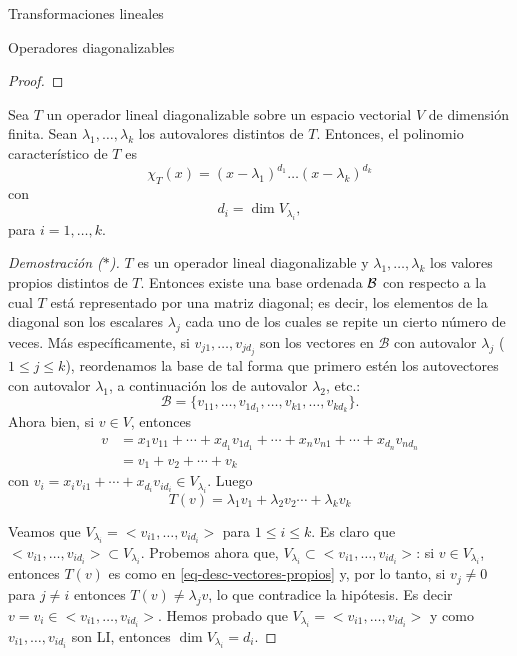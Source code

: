 \begin{chapter}{Transformaciones lineales}
\begin{section}{Operadores diagonalizables}
\begin{proof}
        \end{proof}
    
        \begin{proposicion}
        Sea $T$ un operador lineal diagonalizable sobre un espacio vectorial $V$ de dimensión finita. Sean $\lambda_1,\ldots,\lambda_k$ los autovalores distintos de $T$. Entonces,  el  polinomio característico de $T$ es
        $$
            \chi_T(x) = (x-\lambda_1)^{d_1}\ldots(x-\lambda_k)^{d_k}
        $$
        con
        $$
            d_i =  \dim V_{\lambda_i},
        $$
        para  $i=1, \ldots, k$.
        \end{proposicion}
        \begin{proof}[Demostración ($*$)]
            $T$ es un operador lineal diagonalizable y $\lambda_1,\ldots,\lambda_k$ los valores propios distintos de $T$. Entonces existe una base ordenada $\mathcal{B}$ con respecto a la cual $T$ está representado por una matriz diagonal; es decir, los elementos de la diagonal son los escalares $\lambda_j$ cada uno de los cuales se repite un cierto número de veces. Más específicamente, si
            $v_{j1},\ldots,v_{jd_j}$ son los vectores en $\mathcal{B}$ con autovalor $\lambda_j$ ($1 \le j \le k$),  reordenamos la base de tal forma que primero estén los autovectores con autovalor $\lambda_1$, a continuación los de autovalor $\lambda_2$, etc.: 
            \begin{equation*}
                \mathcal{B} = \{v_{11},\ldots,v_{1d_1},\ldots,v_{k1},\ldots,v_{kd_k}\}. 
            \end{equation*}
            Ahora bien,  si $v \in V$,  entonces 
            \begin{align*}
            v &=x_1v_{11}+\cdots+x_{d_1}v_{1d_1}+\cdots+x_nv_{n1}+\cdots+x_{d_n}v_{nd_n} \\
            &= v_1 + v_2 +\cdots + v_k
            \end{align*}
            con $v_i = x_iv_{i1}+\cdots+x_{d_i}v_{id_i} \in V_{\lambda_i}$. Luego
            \begin{equation}\label{eq-desc-vectores-propios}
                T(v)  =\lambda_1v_1+\lambda_2v_2\cdots+\lambda_kv_k
            \end{equation} 
            
            Veamos que $V_{\lambda_i} = <v_{i1},\ldots,v_{id_i}>$ para $1 \le i \le k$. Es claro que  $<v_{i1},\ldots,v_{id_i}> \subset V_{\lambda_i}$. Probemos  ahora que,  $V_{\lambda_i} \subset <v_{i1},\ldots,v_{id_i}>$: si  $v \in V_{\lambda_i}$,  entonces $T(v)$ es como en \eqref{eq-desc-vectores-propios} y, por lo tanto, si $v_j \ne 0$ para $j\not=i$ entonces $T(v) \ne \lambda_j v$, lo que contradice la hipótesis. Es decir $v = v_i \in <v_{i1},\ldots,v_{id_i}>$. Hemos probado que    $V_{\lambda_i} = <v_{i1},\ldots,v_{id_i}>$ y como $v_{i1},\ldots,v_{id_i}$ son LI, entonces $\dim V_{\lambda_i} = d_i$.
            

\end{proof}
\end{section}
\end{chapter}
